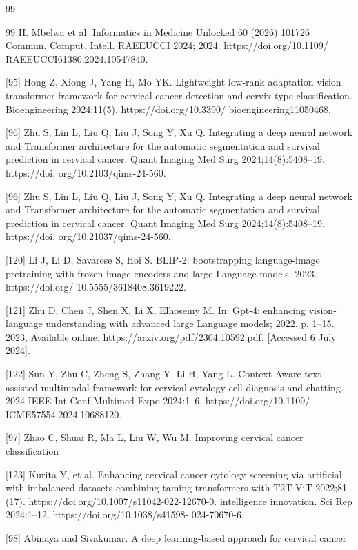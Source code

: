 \documentclass{svjour3}
\begin{document}
\begin{thebibliography}{99}
\begin{thebibliography}{99}
 H. Mbelwa et al. Informatics in Medicine Unlocked 60 (2026) 101726 Commun. Comput. Intell. RAEEUCCI 2024; 2024. https://doi.org/10.1109/ RAEEUCCI61380.2024.10547840.

 [95] Hong Z, Xiong J, Yang H, Mo YK. Lightweight low-rank adaptation vision transformer framework for cervical cancer detection and cervix type classification. Bioengineering 2024;11(5). https://doi.org/10.3390/ bioengineering11050468.

 [96] Zhu S, Lin L, Liu Q, Liu J, Song Y, Xu Q. Integrating a deep neural network and Transformer architecture for the automatic segmentation and survival prediction in cervical cancer. Quant Imaging Med Surg 2024;14(8):5408–19. https://doi. org/10.2103/qims-24-560.

[96] Zhu S, Lin L, Liu Q, Liu J, Song Y, Xu Q. Integrating a deep neural network and Transformer architecture for the automatic segmentation and survival prediction in cervical cancer. Quant Imaging Med Surg 2024;14(8):5408–19. https://doi. org/10.21037/qims-24-560.

[120] Li J, Li D, Savarese S, Hoi S. BLIP-2: bootstrapping language-image pretraining with frozen image encoders and large Language models. 2023. https://doi.org/ 10.5555/3618408.3619222.

[121] Zhu D, Chen J, Shen X, Li X, Elhoseiny M. In: Gpt-4: enhancing vision-language understanding with advanced large Language models; 2022. p. 1–15. 2023, Available online: https://arxiv.org/pdf/2304.10592.pdf. [Accessed 6 July 2024].

[122] Sun Y, Zhu C, Zheng S, Zhang Y, Li H, Yang L. Context-Aware text-assisted multimodal framework for cervical cytology cell diagnosis and chatting. 2024 IEEE Int Conf Multimed Expo 2024:1–6. https://doi.org/10.1109/ ICME57554.2024.10688120.

[97] Zhao C, Shuai R, Ma L, Liu W, Wu M. Improving cervical cancer classification

[123] Kurita Y, et al. Enhancing cervical cancer cytology screening via artificial with imbalanced datasets combining taming transformers with T2T-ViT 2022;81 (17). https://doi.org/10.1007/s11042-022-12670-0. intelligence innovation. Sci Rep 2024:1–12. https://doi.org/10.1038/s41598- 024-70670-6.

[98] Abinaya and Sivakumar. A deep learning-based approach for cervical cancer


\end{thebibliography}
\end{thebibliography}
\end{document}
